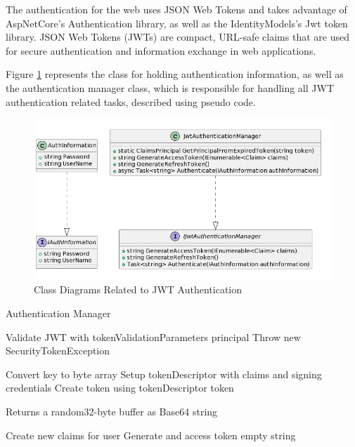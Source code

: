 The authentication for the web uses JSON Web Tokens and takes advantage of AspNetCore's Authentication library, as well as the IdentityModels's Jwt token library. JSON Web Tokens (JWTs) are compact, URL-safe claims that are used for secure authentication and information exchange in web applications. \cite{jwt}

Figure \ref{fig:acd} represents the class for holding authentication information, as well as the authentication manager class, which is responsible for handling all JWT authentication related tasks, described using pseudo code.

\begin{figure}[H]
	\centering
	\includegraphics[width=0.7\linewidth]{img/authentication_classdiagram.png}
	\caption{Class Diagrams Related to JWT Authentication}
	\label{fig:acd}
\end{figure}

\begin{algorithm}
	\caption{Authentication Manager}
	\begin{algorithmic}
		
		\State Validate JWT with tokenValidationParameters
		\State \Return principal
		\Else
		\State Throw new SecurityTokenException
		\EndIf
		\EndFunction
		
		\State Convert key to byte array
		\State Setup tokenDescriptor with claims and signing credentials
		\State Create token using tokenDescriptor
		\State \Return token
		\EndFunction
		
		\State Returns a random32-byte buffer as Base64 string
		\EndFunction
		
		
		\State Create new claims for user
		\State Generate and \Return access token
		\Else
		\State \Return empty string
		\EndIf
		\EndFunction
		
		
	\end{algorithmic}
\end{algorithm}
 
